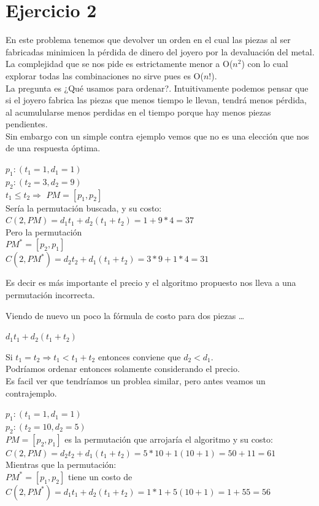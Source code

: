 \documentclass[11pt,a4paper]{article}
\newcommand{\bc}{\begin{center}}
\newcommand{\ec}{\end{center}}
\begin{document}
\section*{Ejercicio 2}

En este problema tenemos que devolver un orden en el cual las piezas al ser fabricadas minimicen la pérdida de dinero del joyero por la devaluación del metal.\\
La complejidad que se nos pide es estrictamente menor a O($n^2$) con lo cual explorar todas las combinaciones no sirve pues es O($n!$).\\
La pregunta es ¿Qué usamos para ordenar?.
Intuitivamente podemos pensar que si el joyero fabrica las piezas que menos tiempo le llevan, tendrá menos pérdida, al acumulularse menos perdidas en el tiempo porque hay menos piezas pendientes.\\
Sin embargo con un simple contra ejemplo vemos que no es una elección que nos de una respuesta óptima.\\
\bc
$p_1 : (t_1 = 1, d_1 = 1)$\\
$p_2 : (t_2 = 3, d_2 = 9)$\\
$t_1 \le t_2  \Rightarrow$ $PM = [p_1, p_2]$\\
Sería la permutación buscada, y su costo:\\
$C(2, PM) = d_1t_1 + d_2(t_1+t_2) = 1 + 9*4 = 37$\\
Pero la permutación \\
$PM^* = [p_2, p_1]$\\
$C(2, PM^*) = d_2t_2 + d_1(t_1+t_2) = 3*9 + 1*4 = 31$\\
\ec
Es decir es más importante el precio y el algoritmo propuesto nos lleva a una permutación incorrecta. 

Viendo de nuevo un poco la fórmula de costo para dos piezas \ldots\\
\bc
$d_1t_1 + d_2(t_1+t_2)$
\ec
Si $t_1 = t_2 \Rightarrow t_1 < t_1 + t_2$ entonces conviene que $d_2 < d_1$.\\
Podríamos ordenar entonces solamente considerando el precio. \\
Es facil ver que tendríamos un problea similar, pero antes veamos un contrajemplo.
\bc
$p_1 : (t_1 = 1, d_1 = 1)$\\
$p_2 : (t_2 = 10, d_2 = 5)$\\
$PM = [p_2, p_1]$ es la permutación que arrojaría el algoritmo y su costo:\\
$C(2, PM) = d_2t_2 + d_1(t_1 + t_2) = 5*10 + 1(10+1) = 50 + 11 = 61$\\
Mientras que la permutación:\\
$PM^* = [p_1, p_2]$ tiene un costo de \\
$C(2, PM^*) = d_1t_1 + d_2(t_1 + t_2) = 1*1 + 5(10+1) = 1 + 55 = 56$\\
\ec
\end{document}
